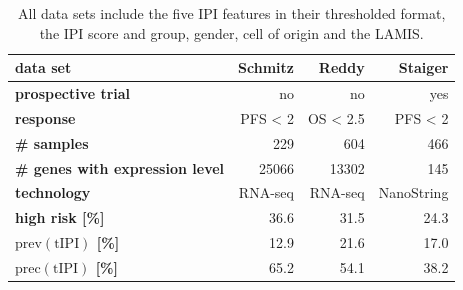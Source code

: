\begin{table}[ht]
    \small
    \centering
    \begin{tabular}{lrrr}
        \hline
        \textbf{data set} & \textbf{Schmitz} \cite{schmitz18} & \textbf{Reddy} \cite{reddy17} & 
            \textbf{Staiger} \cite{staiger20} \\
        \hline
        \textbf{prospective trial} & no & no & yes \\
        \textbf{response} & PFS < 2 & OS < \num{2.5} & PFS < 2 \\
        \textbf{\# samples} & \num{229} & \num{604} & \num{466} \\
        \textbf{\# genes with expression level} & \num{25066} & \num{13302} & \num{145} \\
        \textbf{technology} & RNA-seq & RNA-seq & NanoString \\
        \textbf{high risk [\%]} & \num{36.6} & \num{31.5} & \num{24.3} \\
        \textbf{$\text{prev}(\text{tIPI})$ [\%]} & \num{12.9} & \num{21.6} & \num{17.0} \\
        \textbf{$\text{prec}(\text{tIPI})$ [\%]} & \num{65.2} & \num{54.1} & \num{38.2} \\
        \hline
    \end{tabular}
    \caption{All data sets include the five IPI features in their 
        thresholded format, the IPI score and group, gender, cell of origin and the LAMIS.}
        \label{table:data}
\end{table}
